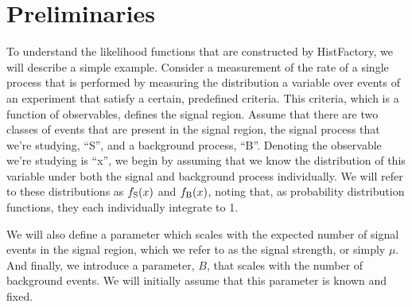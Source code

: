\section{Preliminaries}

To understand the likelihood functions that are constructed by HistFactory, we will describe a simple example.
Consider a measurement of the rate of a single process that is performed by measuring the distribution a variable over events of an experiment that satisfy a certain, predefined criteria.
This criteria, which is a function of observables, defines the signal region.
Assume that there are two classes of events that are present in the signal region, the signal process that we're studying, ``S'', and a background process, ``B''.
Denoting the observable we're studying is ``x'', we begin by assuming that we know the distribution of this variable under both the signal and background process individually.
We will refer to these distributions as $f_{\rm S}(x)$ and $f_{\rm B}(x)$, noting that, as probability distribution functions, they each individually integrate to 1.

We will also define a parameter which scales with the expected number of signal events in the signal region, which we refer to as the signal strength, or simply $\mu$.
And finally, we introduce a parameter, $B$, that scales with the number of background events.
We will initially assume that this parameter is known and fixed.




